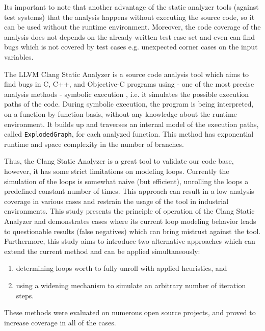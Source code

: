 Its important to note that another advantage of the static analyzer tools 
(against test systems) that the analysis happens without executing the source 
code, so it can be used without the runtime environment. Moreover, the code 
coverage of the analysis does not depends on the already written test case set 
and even can find bugs which is not covered by test cases e.g. unexpected 
corner cases on the input variables. 

The LLVM Clang Static Analyzer is a source code analysis tool which aims to 
find bugs in C,
C++, and Objective-C programs using - one of the most precise analysis methods 
- symbolic execution  \cite{King1975} \cite{Hampapuram2005}, i.e. it simulates 
the possible execution paths of the code. During symbolic execution, the 
program is being interpreted, on a function-by-function basis, without any 
knowledge about the runtime environment. It builds up and traverses an internal 
model of the execution paths, called \texttt{ExplodedGraph}, for each analyzed 
function. This method has exponential runtime and space complexity in the 
number of branches.

Thus, the Clang Static Analyzer is a great tool to validate our code base, 
however, it has some strict limitations on modeling loops. Currently the 
simulation of the loops is somewhat naive (but efficient), unrolling the loops 
a predefined constant number of times. This approach can result in a low 
analysis coverage in various cases and restrain the usage of the tool in 
industrial environments.
This study presents the principle of operation of the Clang Static Analyzer and 
demonstrates cases where its current loop modeling behavior leads to 
questionable results (false negatives) which can bring mistrust against the 
tool. Furthermore, this study aims to introduce two alternative approaches 
which can extend the current method and can be applied simultaneously: 
\begin{enumerate} [label={(\arabic*)}, noitemsep]
	\item determining loops worth to fully unroll with applied heuristics, and
	\item using a widening mechanism to simulate an arbitrary number of 
	iteration steps.
\end{enumerate}
These methods were evaluated on numerous open source projects, and 
 proved to increase coverage in all of the cases.
